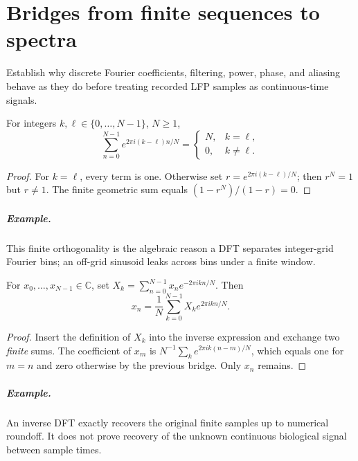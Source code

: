\chapter{Bridges from finite sequences to spectra}\label{ch:bridges-signals}
\begin{readergoal}Establish why discrete Fourier coefficients, filtering, power, phase, and aliasing behave as they do before treating recorded LFP samples as continuous-time signals.\end{readergoal}

\begin{proposition}For integers $k,\ell\in\{0,\ldots,N-1\}$, $N\geq1$,
\[\sum_{n=0}^{N-1}e^{2\pi i(k-\ell)n/N}=\begin{cases}N,&k=\ell,\\0,&k\ne\ell.\end{cases}\]\end{proposition}
\begin{proof}For $k=\ell$, every term is one. Otherwise set $r=e^{2\pi i(k-\ell)/N}$; then $r^N=1$ but $r\ne1$. The finite geometric sum equals $(1-r^N)/(1-r)=0$.\end{proof}
\paragraph{Example.} This finite orthogonality is the algebraic reason a DFT separates integer-grid Fourier bins; an off-grid sinusoid leaks across bins under a finite window.

\begin{proposition}For $x_0,\ldots,x_{N-1}\in\mathbb C$, set $X_k=\sum_{n=0}^{N-1}x_ne^{-2\pi i kn/N}$. Then
\[x_n=\frac1N\sum_{k=0}^{N-1}X_ke^{2\pi i kn/N}.\]\end{proposition}
\begin{proof}Insert the definition of $X_k$ into the inverse expression and exchange two \emph{finite} sums. The coefficient of $x_m$ is $N^{-1}\sum_k e^{2\pi i k(n-m)/N}$, which equals one for $m=n$ and zero otherwise by the previous bridge. Only $x_n$ remains.\end{proof}
\paragraph{Example.} An inverse DFT exactly recovers the original finite samples up to numerical roundoff. It does not prove recovery of the unknown continuous biological signal between sample times.

